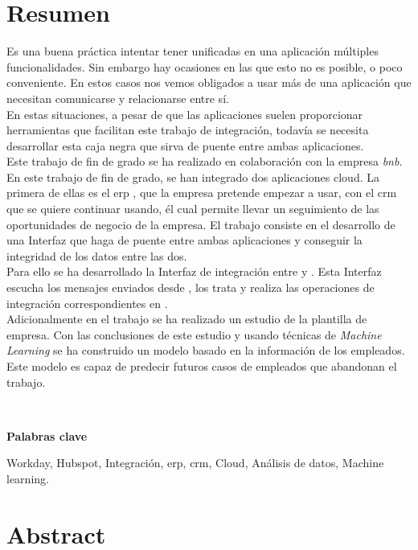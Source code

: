 \chapter*{Resumen}
	
	Es una buena práctica intentar tener unificadas en una aplicación múltiples funcionalidades.
	Sin embargo hay ocasiones en las que esto no es posible, o poco conveniente.
	En estos casos nos vemos obligados a usar más de una aplicación que necesitan comunicarse y relacionarse entre sí.\\
	
	En estas situaciones, a pesar de que las aplicaciones suelen proporcionar herramientas que facilitan este trabajo de integración, todavía se necesita desarrollar esta
	caja negra que sirva de puente entre ambas aplicaciones.\\
	
	Este trabajo de fin de grado se ha realizado en colaboración con la empresa \textit{\acrfull{bnb}}.
	En este trabajo de fin de grado, se han integrado dos aplicaciones cloud. La primera de ellas es el \acrshort{erp} \wday{}, que la empresa pretende empezar a usar,
	con el \acrshort{crm} \hs{} que se quiere continuar usando, él cual permite llevar un seguimiento de las oportunidades de negocio de la empresa.
	El trabajo consiste en el desarrollo de una Interfaz que haga de puente entre ambas aplicaciones y conseguir la integridad de los datos entre las dos. \\
	
	
	Para ello se ha desarrollado la Interfaz de integración entre \hs{} y \wday{}. Esta Interfaz escucha los mensajes enviados desde \hs{}, los trata y realiza las operaciones de integración correspondientes en \wday{}.\\

	
	
	Adicionalmente en el trabajo se ha realizado un estudio de la plantilla de empresa.
	Con las conclusiones de este estudio y usando técnicas de \textit{Machine Learning} se ha construido
	un modelo basado en la información de los empleados. Este modelo es capaz de predecir futuros casos de empleados que abandonan el trabajo.
	

	\
	
	\textbf{Palabras clave}
    
    Workday, Hubspot, Integración, \acrfull{erp}, \acrfull{crm}, Cloud, Análisis de datos, Machine learning.


\chapter*{Abstract}
	
